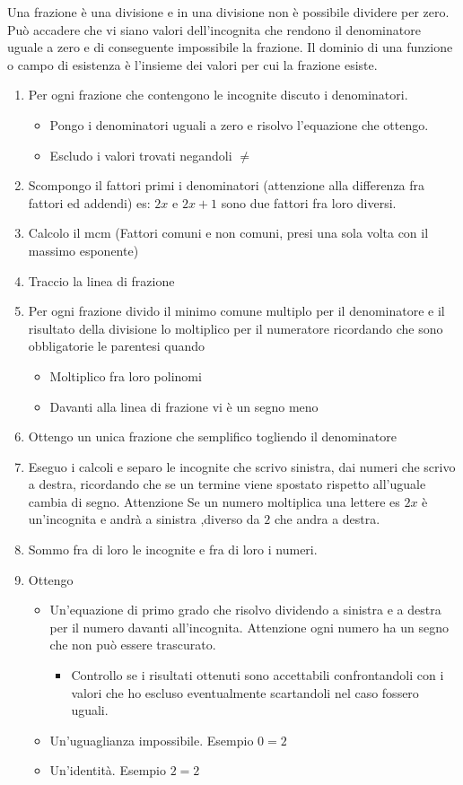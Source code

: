 Una frazione è una divisione e in una divisione non è possibile dividere per zero. Può accadere  che vi siano valori dell'incognita che rendono il denominatore uguale a zero e di conseguente impossibile la frazione. Il dominio di una funzione o campo di esistenza è l'insieme dei valori per cui la frazione esiste.
\begin{enumerate}
\item Per ogni frazione che contengono le incognite discuto i denominatori.
	\begin{itemize}
	\item Pongo i denominatori uguali a zero e risolvo l'equazione che ottengo.
	\item Escludo i valori trovati negandoli $\neq$
	\end{itemize}
	\item  Scompongo il fattori primi i denominatori (attenzione alla differenza fra fattori ed addendi) es: $2x$ e  $2x+1$ sono due fattori fra loro diversi.
	\item Calcolo il mcm (Fattori comuni e non comuni, presi una sola volta con il massimo esponente)
	\item Traccio la linea di frazione 
	\item Per ogni frazione divido il minimo comune multiplo per il denominatore e il risultato della divisione lo moltiplico per il numeratore ricordando che sono obbligatorie le parentesi quando 
	\begin{itemize}
	\item Moltiplico fra loro polinomi
	\item Davanti alla linea di frazione vi è un segno meno
	\end{itemize}
	\item Ottengo un unica frazione che semplifico togliendo il denominatore
	\item Eseguo i calcoli e separo le incognite che scrivo sinistra, dai numeri che scrivo a destra, ricordando che  se un termine viene spostato rispetto all'uguale cambia di segno. Attenzione Se un numero moltiplica una lettere es $2x$ è un'incognita e andrà a sinistra ,diverso da $2$ che andra a destra.
	\item Sommo fra di loro le incognite e fra di loro i numeri.
	\item Ottengo 
	\begin{itemize}
	\item Un'equazione di primo grado che risolvo dividendo  a sinistra e a destra per il numero davanti all'incognita. Attenzione ogni numero ha un segno che non può essere trascurato.
	\begin{itemize}
	\item Controllo se i risultati ottenuti  sono accettabili confrontandoli con i valori che ho escluso eventualmente scartandoli nel caso fossero uguali.
	\end{itemize}
	\item Un'uguaglianza impossibile. Esempio $0=2$
	\item Un'identità. Esempio $2=2$
	\end{itemize}
\end{enumerate}
